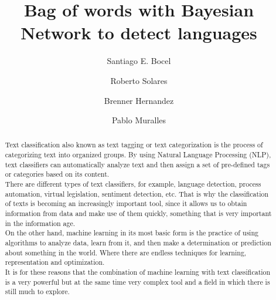 \documentclass[sigconf,12pt,review=false,natbib=false]{acmart}
\begin{document}
\renewcommand\footnotetextcopyrightpermission[1]{}
\pagestyle{plain}

\title{Bag of words with Bayesian Network to detect languages}


\author{Santiago E. Bocel}

\author{Roberto Solares}

\author{Brenner Hernandez}

\author{Pablo Muralles}

\begin{abstract}

Text classification also known as text tagging or text categorization is the process of categorizing
text into organized groups. By using Natural Language Processing (NLP), text classifiers can
automatically analyze text and then assign a set of pre-defined tags or categories based on its
content. \\

There are different types of text classifiers, for example, language detection, process automation,
virtual legislation, sentiment detection, etc. That is why the classification of texts is becoming
an increasingly important tool, since it allows us to obtain information from data and make use of
them quickly, something that is very important in the information age. \\

On the other hand, machine learning in its most basic form is the practice of using algorithms to
analyze data, learn from it, and then make a determination or prediction about something in the
world. Where there are endless techniques for learning, representation and optimization. \\

It is for these reasons that the combination of machine learning with text classification is a very
powerful but at the same time very complex tool and a field in which there is still much to
explore. \\

\end{abstract}
\end{document}
